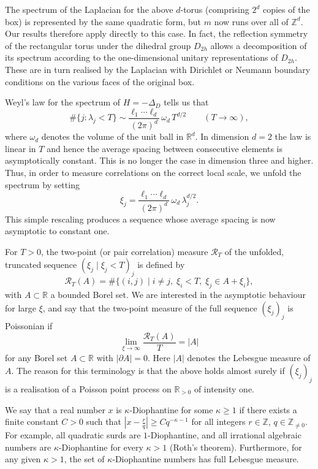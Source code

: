 \documentclass[12pt]{amsart}
\theoremstyle{definition}
\theoremstyle{remark}
\numberwithin{equation}{section}
\newcommand{\R}{\mathbb{R}}
\newcommand{\Z}{\mathbb{Z}}
\newcommand{\cR}{\mathcal{R}}
\begin{document}
The spectrum of the Laplacian for the above $d$-torus (comprising $2^d$ copies of the box) is represented by the same quadratic form, but $m$ now runs over all of $\Z^d$. Our results therefore apply directly to this case. In fact, the reflection symmetry of the rectangular torus under the dihedral group $D_{2h}$ allows a decomposition of its spectrum according to the one-dimensional unitary representations of $D_{2h}$. These are in turn realised by the Laplacian with Dirichlet or Neumann boundary conditions on the various faces of the original box.  

Weyl's law for the spectrum of $H=-\Delta_D$ tells us that
\begin{equation}\label{WeylsLaw}
\#\{ j : \lambda_j < T \} \sim \frac{\ell_1\cdots\ell_d}{(2\pi)^d} \,\omega_d \, T^{d/2} \qquad (T\to\infty),
\end{equation}
where $\omega_d$ denotes the volume of the unit ball in $\R^d$. In dimension $d=2$ the law is linear in $T$ and hence the average spacing between consecutive elements is asymptotically constant. This is no longer the case in dimension three and higher. Thus, in order to measure correlations on the correct local scale, we unfold the spectrum by setting
\begin{equation}\label{unfold}
\xi_j = \frac{\ell_1\cdots\ell_d}{(2\pi)^d} \,\omega_d \, \lambda_j^{d/2} .
\end{equation}
This simple rescaling produces a sequence whose average spacing is now asymptotic to constant one.

For $T>0$, the two-point (or pair correlation) measure $\cR_T$ of the unfolded, truncated sequence $(\xi_j \mid \xi_j<T)_j$ is defined by
\begin{equation}
\cR_T(A) = \#\{ (i,j) \mid i\neq j, \; \xi_i<T,\; \xi_j \in A+\xi_i\} ,
\end{equation}
with $A\subset\R$ a bounded Borel set. We are interested in the asymptotic behaviour for large $\xi$, and say that the two-point measure of the full sequence $(\xi_j)_j$ is Poissonian if
\begin{equation}
\lim_{\xi\to\infty} \frac{ \cR_T(A) }{T}  = |A| 
\end{equation}
for any Borel set $A\subset\R$ with $|\partial A|=0$. Here $|A|$ denotes the Lebesgue measure of $A$.
The reason for this terminology is that the above holds almost surely if $(\xi_j)_j$ is a realisation of a Poisson point process on $\R_{>0}$ of intensity one. 

We say that a real number $x$ is $\kappa$-Diophantine for some $\kappa \geq 1$ if there exists a finite constant $C>0$ such that $|x - \tfrac{r}{q}| \geq C q^{-\kappa -1}$ for all integers $r\in\Z$, $q\in\Z_{\neq 0}$. For example, all quadratic surds are $1$-Diophantine, and all irrational algebraic numbers are $\kappa$-Diophantine for every $\kappa>1$ (Roth's theorem). Furthermore, for any given $\kappa>1$, the set of $\kappa$-Diophantine numbers has full Lebesgue measure. 
\end{document}
